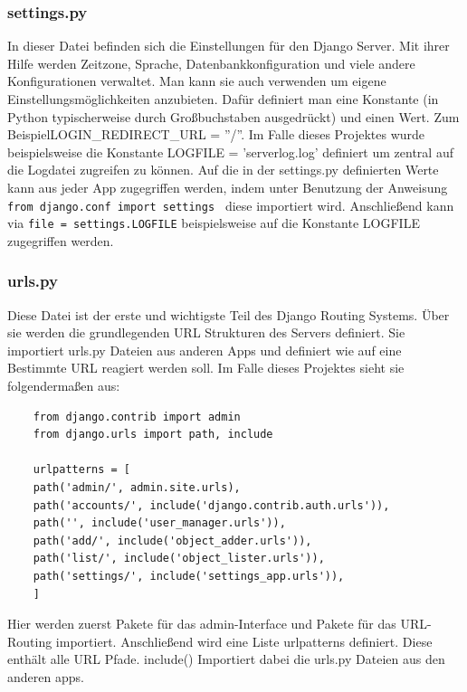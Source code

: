 \documentclass{article}
\begin{document}
\subsubsection{settings.py}
In dieser Datei befinden sich die Einstellungen für den Django Server. Mit ihrer Hilfe werden Zeitzone, Sprache, Datenbankkonfiguration und viele andere Konfigurationen verwaltet. Man kann sie auch verwenden um eigene Einstellungsmöglichkeiten anzubieten. Dafür definiert man eine Konstante (in Python typischerweise durch Großbuchstaben ausgedrückt) und einen Wert. Zum Beispiel\newline LOGIN\_REDIRECT\_URL = ''/''. Im Falle dieses Projektes wurde beispielsweise die Konstante LOGFILE = 'serverlog.log' definiert um zentral auf die Logdatei zugreifen zu können. Auf die in der settings.py definierten Werte kann aus jeder App zugegriffen werden, indem unter Benutzung der Anweisung\newline
 \texttt{from django.conf import settings }  diese importiert wird. Anschließend kann via \texttt{file = settings.LOGFILE} beispielsweise auf die Konstante LOGFILE zugegriffen werden.
 
\subsubsection{urls.py}
Diese Datei ist der erste und wichtigste Teil des Django Routing Systems. Über sie werden die grundlegenden URL Strukturen des Servers definiert. Sie importiert urls.py Dateien aus anderen Apps und definiert wie auf eine Bestimmte URL reagiert werden soll. Im Falle dieses Projektes sieht sie folgendermaßen aus:

\begin{verbatim}
	from django.contrib import admin
	from django.urls import path, include
	
	urlpatterns = [
	path('admin/', admin.site.urls),
	path('accounts/', include('django.contrib.auth.urls')),
	path('', include('user_manager.urls')),
	path('add/', include('object_adder.urls')),
	path('list/', include('object_lister.urls')),
	path('settings/', include('settings_app.urls')),
	]
\end{verbatim}
Hier werden zuerst Pakete für das admin-Interface und Pakete für das URL-Routing importiert. Anschließend wird eine Liste urlpatterns definiert. Diese enthält alle URL Pfade. include() Importiert dabei die urls.py Dateien aus den anderen apps.
\end{document}

